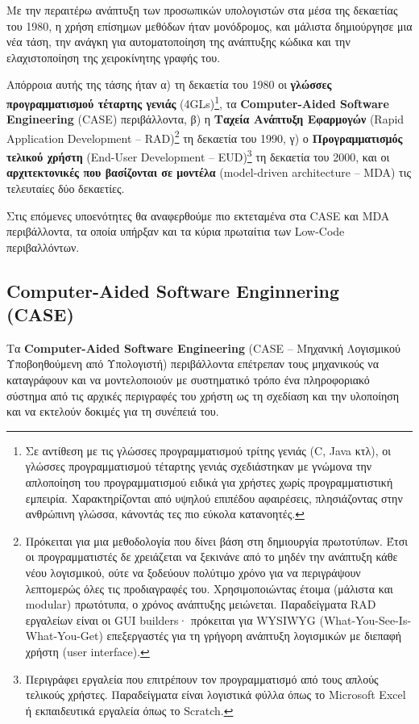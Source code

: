         Με την περαιτέρω ανάπτυξη των προσωπικών υπολογιστών στα μέσα της δεκαετίας του 1980, η χρήση επίσημων μεθόδων ήταν μονόδρομος, και μάλιστα δημιούργησε μια νέα τάση, την ανάγκη για αυτοματοποίηση της ανάπτυξης κώδικα και την ελαχιστοποίηση της χειροκίνητης γραφής του.

        Απόρροια αυτής της τάσης ήταν α) τη δεκαετία του 1980 οι \textbf{γλώσσες προγραμματισμού τέταρτης γενιάς} (4GLs)\footnote{Σε αντίθεση με τις γλώσσες προγραμματισμού τρίτης γενιάς (C, Java κτλ), οι γλώσσες προγραμματισμού τέταρτης γενιάς σχεδιάστηκαν με γνώμονα την απλοποίηση του προγραμματισμού ειδικά για χρήστες χωρίς προγραμματιστική εμπειρία. Χαρακτηρίζονται από υψηλού επιπέδου αφαιρέσεις, πλησιάζοντας στην ανθρώπινη γλώσσα, κάνοντάς τες πιο εύκολα κατανοητές.}, τα \textbf{Computer-Aided Software Engineering} (CASE) περιβάλλοντα, β) η \textbf{Ταχεία Ανάπτυξη Εφαρμογών} (Rapid Application Development -- RAD)\footnote{Πρόκειται για μια μεθοδολογία που δίνει βάση στη δημιουργία πρωτοτύπων. Έτσι οι προγραμματιστές δε χρειάζεται να ξεκινάνε από το μηδέν την ανάπτυξη κάθε νέου λογισμικού, ούτε να ξοδεύουν πολύτιμο χρόνο για να περιγράψουν λεπτομερώς όλες τις προδιαγραφές του. Χρησιμοποιώντας έτοιμα (μάλιστα και modular) πρωτότυπα, ο χρόνος ανάπτυξης μειώνεται. Παραδείγματα RAD εργαλείων είναι οι GUI builders· πρόκειται για WYSIWYG (What-You-See-Is-What-You-Get) επεξεργαστές για τη γρήγορη ανάπτυξη λογισμικών με διεπαφή χρήστη (user interface).} τη δεκαετία του 1990, γ) ο \textbf{Προγραμματισμός τελικού χρήστη} (End-User Development -- EUD)\footnote{Περιγράφει εργαλεία που επιτρέπουν τον προγραμματισμό από τους απλούς τελικούς χρήστες. Παραδείγματα είναι λογιστικά φύλλα όπως το Microsoft Excel ή εκπαιδευτικά εργαλεία όπως το Scratch.} τη δεκαετία του 2000, και οι \textbf{αρχιτεκτονικές που βασίζονται σε μοντέλα} (model-driven architecture -- MDA) τις τελευταίες δύο δεκαετίες. \cite{Case1985, CASEChikofsky, MDELow}

        Στις επόμενες υποενότητες θα αναφερθούμε πιο εκτεταμένα στα CASE και MDA περιβάλλοντα, τα οποία υπήρξαν και τα κύρια πρωταίτια των Low-Code περιβαλλόντων.

        \subsection{Computer-Aided Software Enginnering (CASE)}
            Τα \textbf{Computer-Aided Software Engineering} (CASE -- Μηχανική Λογισμικού Υποβοηθούμενη από Υπολογιστή) περιβάλλοντα επέτρεπαν τους μηχανικούς να καταγράφουν και να μοντελοποιούν με συστηματικό τρόπο ένα πληροφοριακό σύστημα από τις αρχικές περιγραφές του χρήστη ως τη σχεδίαση και την υλοποίηση και να εκτελούν δοκιμές για τη συνέπειά του.

